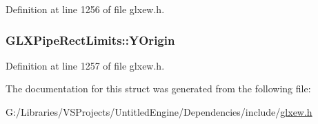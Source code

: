 Definition at line 1256 of file glxew.\+h.

\hypertarget{struct_g_l_x_pipe_rect_limits_a50e06bcf0dae95854be7d93a515199e9}{}
\subsubsection[{Y\+Origin}]{ G\+L\+X\+Pipe\+Rect\+Limits\+::\+Y\+Origin}\label{struct_g_l_x_pipe_rect_limits_a50e06bcf0dae95854be7d93a515199e9}


Definition at line 1257 of file glxew.\+h.



The documentation for this struct was generated from the following file\+:\begin{DoxyCompactItemize}
\item 
G\+:/\+Libraries/\+V\+S\+Projects/\+Untitled\+Engine/\+Dependencies/include/\hyperlink{glxew_8h}{glxew.\+h}\end{DoxyCompactItemize}
